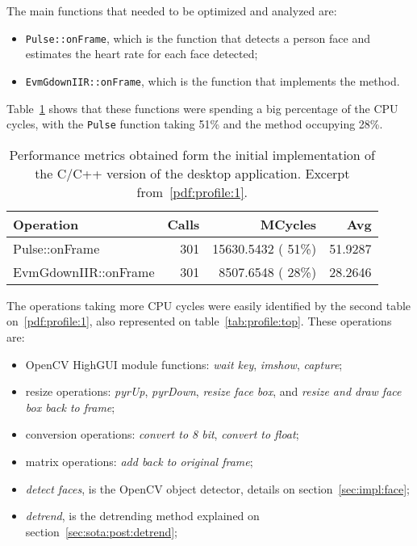 The main functions that needed to be optimized and analyzed are:

\begin{itemize}
  \item \texttt{Pulse::onFrame}, which is the function that detects a
        person face and estimates the heart rate for each face detected;
  \item \texttt{EvmGdownIIR::onFrame}, which is the function that
        implements the \evm{} method.
\end{itemize}

Table~\ref{tab:profile:initial} shows that these functions were spending
a big percentage of the CPU cycles, with the \texttt{Pulse} function
taking 51\% and the \evm{} method occupying 28\%.

\begin{table}[p]
  \centering
  \begin{tabular}{lrrr}
    \hline
    Operation & Calls & MCycles & Avg \\
    \hline
    Pulse::onFrame        & 301 & 15630.5432 ( 51\%) & 51.9287 \\
    EvmGdownIIR::onFrame  & 301 &  8507.6548 ( 28\%) & 28.2646 \\
    \hline
  \end{tabular}
  \caption{
    Performance metrics obtained form the initial implementation of the C/C++
    version of the desktop application. Excerpt from~\ref{pdf:profile:1}.
  }
  \label{tab:profile:initial}
\end{table}

The operations taking more CPU cycles were easily identified by the
second table on~\ref{pdf:profile:1}, also represented on
table~\ref{tab:profile:top}. These operations are:

\begin{itemize}
  \item OpenCV HighGUI module functions: \emph{wait key}, \emph{imshow},
        \emph{capture};
  \item resize operations: \emph{pyrUp}, \emph{pyrDown}, \emph{resize face box},
        and \emph{resize and draw face box back to frame};
  \item conversion operations: \emph{convert to 8 bit}, \emph{convert to float};
  \item matrix operations: \emph{add back to original frame};
  \item \emph{detect faces}, is the OpenCV object detector, details on
        section~\ref{sec:impl:face};
  \item \emph{detrend}, is the detrending method explained on
        section~\ref{sec:sota:post:detrend};
\end{itemize}

